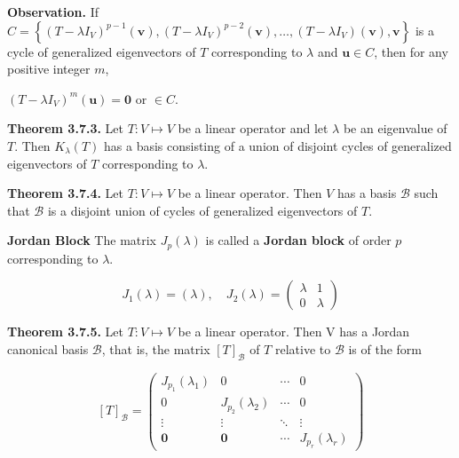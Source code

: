 \documentclass[10pt,landscape]{article}
\begin{document}
\begin{multicols}{4}
\textbf{Observation.} If $C=\left\{\left(T-\lambda I_{V}\right)^{p-1}(\mathbf{v}),\left(T-\lambda I_{V}\right)^{p-2}(\mathbf{v}), \ldots,\left(T-\lambda I_{V}\right)(\mathbf{v}), \mathbf{v}\right\}$ is a cycle of generalized eigenvectors of $T$ corresponding to $\lambda$ and $\mathbf{u} \in C$, then for any positive integer $m$,

$(T - \lambda I_V)^m (\mathbf{u}) = \mathbf{0} \text{ or } \in C$.







\textbf{Theorem 3.7.3.} Let $T : V \mapsto V$ be a linear operator and let $\lambda$ be an eigenvalue of $T$. Then $K_{\lambda}(T)$ has a basis consisting of a union of disjoint cycles of generalized eigenvectors of $T$ corresponding to $\lambda$.

\textbf{Theorem 3.7.4.} Let $T: V \mapsto V$ be a linear operator. Then $V$ has a basis $\mathcal{B}$ such that $\mathcal{B}$ is a disjoint union of cycles of generalized eigenvectors of $T$.

\textbf{Jordan Block} The matrix $J_p(\lambda)$ is called a \textbf{Jordan block} of order $p$ corresponding to $\lambda$.

$$
J_{1}(\lambda)=(\lambda), \quad J_{2}(\lambda)=\left(\begin{array}{cc}
\lambda & 1 \\
0 & \lambda
\end{array}\right)
$$

\textbf{Theorem 3.7.5.} Let $T: V \mapsto V$ be a linear operator. Then V has a Jordan canonical basis $\mathcal{B}$, that is, the matrix $[T]_{\mathcal{B}}$ of $T$ relative to $\mathcal{B}$ is of the form

$$
[T]_{\mathcal{B}}=\left(\begin{array}{cccc}
J_{p_{1}}\left(\lambda_{1}\right) & 0 & \cdots & 0 \\
0 & J_{p_{2}}\left(\lambda_{2}\right) & \cdots & 0 \\
\vdots & \vdots & \ddots & \vdots \\
\mathbf{0} & \mathbf{0} & \cdots & J_{p_{r}}\left(\lambda_{r}\right)
\end{array}\right)
$$


\end{multicols}
\end{document}
